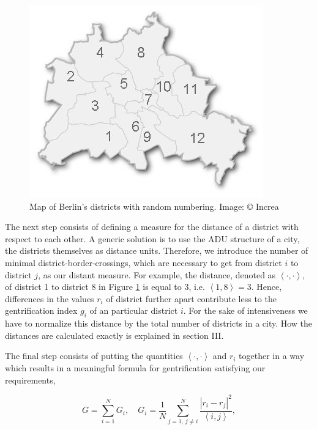 \documentclass[a4paper, 10pt]{IEEEconf}      %
\begin{document}
\begin{figure}
	\centering{}\includegraphics[scale=0.5]{stadtplan-berlin.jpg}
	\caption{Map of Berlin's districts with random numbering. Image: © Increa}
	\label{fig:map_berlin}
\end{figure}

The next step consists of defining a measure for the distance of a district with respect to each other. 
A generic solution is to use the ADU structure of a city, the districts themselves as distance units. 
Therefore, we introduce the number of minimal district-border-crossings, which are necessary to get from 
district $i$ to district $j$, as our distant measure. For example, the distance, denoted as $\left\langle \cdot,\cdot\right\rangle $,
of district 1 to district 8 in Figure \ref{fig:map_berlin} is equal to 3, i.e. $\left\langle 1,8\right\rangle =3$.
Hence, differences in the values $r_{i}$ of district further apart contribute less to the gentrification index $g_{i}$
of an particular district $i$. For the sake of intensiveness we have to normalize this distance by the total number of 
districts in a city. How the distances are calculated exactly is explained in section III.

The final step consists of putting the quantities $\left\langle \cdot,\cdot\right\rangle $ and $r_{i}$ together 
in a way which results in a meaningful formula for gentrification satisfying our requirements, 

\begin{equation}
G=\sum_{i=1}^{N}G_{i},\quad G_{i}=\frac1{N}\sum_{j=1,\,j\neq i}^{N}\frac{\left|r_{i}-r_{j}\right|^{2}}{\left\langle i,j\right\rangle },
\label{eq:gindex}
\end{equation}
\end{document}
